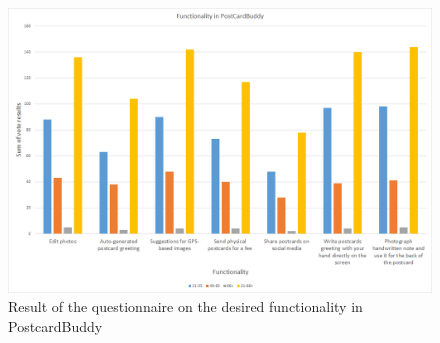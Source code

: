 \documentclass[10pt,a4paper]{article}
\begin{document}
\begin{figure}[h!]
\centering
\includegraphics[width=1.0\textwidth]{questionnaire.png}
\caption{Result of the questionnaire on the desired functionality in PostcardBuddy}
\label{fig:questionnaire}
\end{figure}


\end{document}
